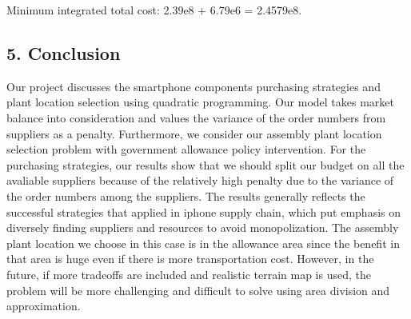 \documentclass[11pt]{article}
\begin{document}
Minimum integrated total cost: 2.39e8 + 6.79e6 = 2.4579e8.

    \hypertarget{conclusion}{%
\subsection{5. Conclusion}\label{conclusion}}

Our project discusses the smartphone components purchasing strategies
and plant location selection using quadratic programming. Our model
takes market balance into consideration and values the variance of the
order numbers from suppliers as a penalty. Furthermore, we consider our
assembly plant location selection problem with government allowance
policy intervention. For the purchasing strategies, our results show
that we should split our budget on all the avaliable suppliers because
of the relatively high penalty due to the variance of the order numbers
among the suppliers. The results generally reflects the successful
strategies that applied in iphone supply chain, which put emphasis on
diversely finding suppliers and resources to avoid monopolization. The
assembly plant location we choose in this case is in the allowance area
since the benefit in that area is huge even if there is more
transportation cost. However, in the future, if more tradeoffs are
included and realistic terrain map is used, the problem will be more
challenging and difficult to solve using area division and
approximation.


    
    
    
    
\end{document}
